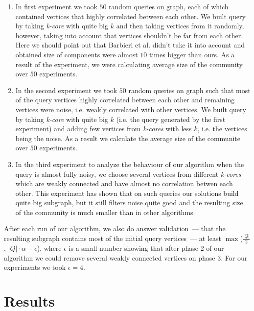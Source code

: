 \begin{enumerate}
\item In first experiment we took $50$ random queries on graph, each of which contained vertices that highly correlated between each other. We built query by taking \textit{k-core} with quite big $k$ and then taking vertices from it randomly, however, taking into account that vertices shouldn't be far from each other. Here we should point out that Barbieri et al. \cite{Barbieri15} didn't take it into account and obtained size of components were almost $10$ times bigger than ours. As a result of the experiment, we were calculating average size of the community over $50$ experiments.

\item In the second experiment we took $50$ random queries on graph such that most of the query vertices highly correlated between each other and remaining vertices were noise, i.e. weakly correlated with other vertices. We built query by taking \textit{k-core} with quite big $k$ (i.e. the query generated by the first experiment) and adding few vertices from \textit{k-cores} with less $k$, i.e. the vertices being the noise. As a result we calculate the average size of the communite over $50$ experiments. 

\item In the third experiment to analyze the behaviour of our algorithm when the query is almost fully noisy, we choose several vertices from different \textit{k-cores} which are weakly connected and have almost no correlation betwen each other. This experiment has shown that on such queries our solutions build quite big subgraph, but it still filters noise quite good and the resulting size of the community is much smaller than in other algorithms.
\end{enumerate}

After each run of our algorithm, we also do answer validation~--- that the resulting subgraph contains most of the initial query vertices~--- at least $\max$($\frac{|Q|}{2}$, $|Q| \cdot \alpha - \epsilon$), where $\epsilon$ is a small number showing that after phase $2$ of our algorithm we could remove several weakly connected vertices on phase $3$. For our experiments we took $\epsilon = 4$.

\section{Results}


